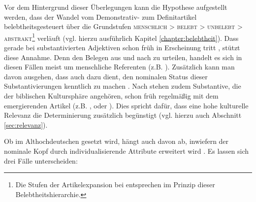 Vor dem Hintergrund dieser Überlegungen kann die Hypothese aufgestellt werden, dass der Wandel vom Demonstrativ- zum Definitartikel belebtheitsgesteuert über die Grundstufen \textsc{menschlich > belebt > unbelebt > abstrakt}\footnote{Die Stufen der Artikelexpansion bei \textcite[34ff.]{Hodler1954} entsprechen im Prinzip dieser Belebtheitshierarchie.} verläuft (vgl. hierzu ausführlich Kapitel \ref{chapter:belebtheit}). Dass  gerade bei substantivierten Adjektiven schon früh in Erscheinung tritt \parencite[44]{Ebert1978}, stützt diese Annahme. Denn den Belegen aus \textcite[55f.]{Jager1917} und \textcite[75f.]{Oubouzar1992} nach zu urteilen, handelt es sich in diesen Fällen meist um menschliche Referenten (z.B.    ). Zusätzlich kann man davon ausgehen, dass  auch dazu dient, den nominalen Status dieser Substantivierungen kenntlich zu machen \parencite[vgl. auch][174]{Leiss2000}. 
Nach \textcite[45]{Hodler1954} stehen zudem Substantive, die der biblischen Kultursphäre angehören, schon früh regelmäßig mit dem emergierenden Artikel (z.B.  ,   oder  ). Dies spricht dafür, dass eine hohe kulturelle Relevanz die Determinierung zusätzlich begünstigt (vgl. hierzu auch Abschnitt \ref{sec:relevanz}).   


Ob  im Althochdeutschen gesetzt wird, hängt auch davon ab, inwiefern der nominale Kopf durch individualisierende Attribute erweitert wird \parencite[vgl.][]{Graf1905,Witzig1910,Jager1917,Hodler1954,Oubouzar1992,Oubouzar1997,Schrodt2004,Szczepaniak2015}. Es lassen sich drei Fälle unterscheiden: 

